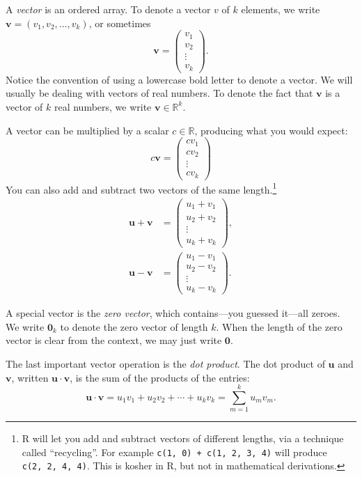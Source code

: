 \documentclass[
  12pt,
  oneside,openany]{book}
\begin{document}
A \emph{vector} is an ordered array. To denote a vector \(v\) of \(k\) elements, we write \(\mathbf{v} = (v_1, v_2, \ldots, v_k)\), or sometimes
\[
\mathbf{v} = \begin{pmatrix} v_1 \\ v_2 \\ \vdots \\ v_k \end{pmatrix}.
\]
Notice the convention of using a lowercase bold letter to denote a vector. We will usually be dealing with vectors of real numbers. To denote the fact that \(\mathbf{v}\) is a vector of \(k\) real numbers, we write \(\mathbf{v} \in \mathbb{R}^k\).

A vector can be multiplied by a scalar \(c \in \mathbb{R}\), producing what you would expect:
\[
c \mathbf{v} = \begin{pmatrix} c v_1 \\ c v_2 \\ \vdots \\ c v_k \end{pmatrix}
\]
You can also add and subtract two vectors of the same length.\footnote{R will let you add and subtract vectors of different lengths, via a technique called ``recycling''. For example \texttt{c(1,\ 0)\ +\ c(1,\ 2,\ 3,\ 4)} will produce \texttt{c(2,\ 2,\ 4,\ 4)}. This is kosher in R, but not in mathematical derivations.}
\[
\begin{aligned}
\mathbf{u} + \mathbf{v} &= \begin{pmatrix}
  u_1 + v_1 \\ u_2 + v_2 \\ \vdots \\ u_k + v_k
\end{pmatrix}, \\
\mathbf{u} - \mathbf{v} &= \begin{pmatrix}
  u_1 - v_1 \\ u_2 - v_2 \\ \vdots \\ u_k - v_k
\end{pmatrix}.
\end{aligned}
\]

A special vector is the \emph{zero vector}, which contains---you guessed it---all zeroes. We write \(\mathbf{0}_k\) to denote the zero vector of length \(k\). When the length of the zero vector is clear from the context, we may just write \(\mathbf{0}\).

The last important vector operation is the \emph{dot product}. The dot product of \(\mathbf{u}\) and \(\mathbf{v}\), written \(\mathbf{u} \cdot \mathbf{v}\), is the sum of the products of the entries:
\[
\mathbf{u} \cdot \mathbf{v}
=
u_1 v_1 + u_2 v_2 + \cdots + u_k v_k
=
\sum_{m=1}^k u_m v_m.
\]
\end{document}
